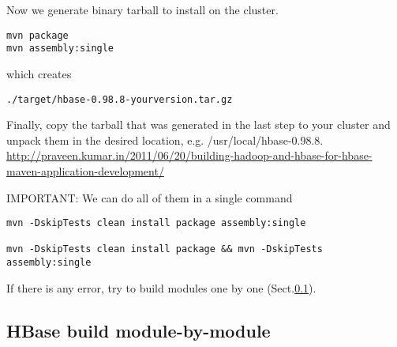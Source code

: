 Now we generate binary tarball to install on the cluster. 
\begin{verbatim}
mvn package
mvn assembly:single
\end{verbatim}
which creates
\begin{verbatim}
./target/hbase-0.98.8-yourversion.tar.gz
\end{verbatim}
Finally, copy the tarball that was generated in the last step to your cluster
and unpack them in the desired location, e.g. /usr/local/hbase-0.98.8.
\url{http://praveen.kumar.in/2011/06/20/building-hadoop-and-hbase-for-hbase-maven-application-development/}

IMPORTANT: We can do all of them in a single command
\begin{verbatim}
mvn -DskipTests clean install package assembly:single

mvn -DskipTests clean install package && mvn -DskipTests assembly:single
\end{verbatim}

If there is any error, try to build modules one by one
(Sect.\ref{sec:hbase_build_one-by-one}).

\subsection{HBase build module-by-module}
\label{sec:hbase_build_one-by-one}

